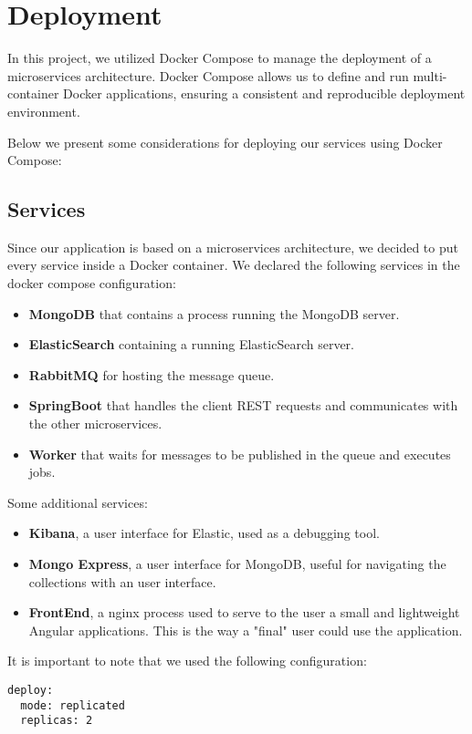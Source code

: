 \section{Deployment}
\label{ch:depl}

In this project, we utilized Docker Compose to manage the deployment of a
microservices architecture. Docker Compose allows us to define and run
multi-container Docker applications, ensuring a consistent and reproducible
deployment environment.

Below we present some considerations for
deploying our services using Docker Compose:

\subsection{Services}
Since our application is based on a microservices architecture, we decided
to put every service inside a Docker container.
We declared the following services in the docker compose configuration:
\begin{itemize}
        \item \textbf{MongoDB} that contains a process running the MongoDB server.
        \item \textbf{ElasticSearch} containing a running ElasticSearch server.
        \item \textbf{RabbitMQ} for hosting the message queue.
        \item \textbf{SpringBoot} that handles the client REST requests and
                communicates with the other microservices.
        \item \textbf{Worker} that waits for messages to be published in the
                queue and executes jobs.
\end{itemize}
Some additional services:
\begin{itemize}
        \item \textbf{Kibana}, a user interface for Elastic, used as a debugging
                tool.
        \item \textbf{Mongo Express}, a user interface for MongoDB, useful
                for navigating the collections with an user interface.
        \item \textbf{FrontEnd}, a nginx process used to serve to the user
                a small and lightweight Angular applications. This is the
                way a "final" user could use the application.
\end{itemize}

It is important to note that we used the following configuration:
\begin{lstlisting}[frame=single,caption=Replicas of a services,label=replicas]
deploy:
  mode: replicated
  replicas: 2
\end{lstlisting}

